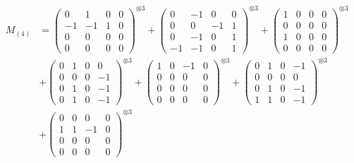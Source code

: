 \documentclass{article}
\newcommand{\Mthree}{%
    M_{(4)}
}
\begin{document}
        \newpage
        
        \footnotesize{
        \begin{align}
        \Mthree
        &= \label{Rs16-Rc11-Solution-24-c1} \begin{pmatrix} 0 & 1 & 0 & 0 \\ -1 & -1 & 1 & 0 \\ 0 & 0 & 0 & 0 \\ 0 & 0 & 0 & 0 \end{pmatrix}^{\otimes 3} 
            + \begin{pmatrix} 0 & -1 & 0 & 0 \\ 0 & 0 & -1 & 1 \\ 0 & -1 & 0 & 1 \\ -1 & -1 & 0 & 1 \end{pmatrix}^{\otimes 3} 
            + \begin{pmatrix} 1 & 0 & 0 & 0 \\ 0 & 0 & 0 & 0 \\ 1 & 0 & 0 & 0 \\ 0 & 0 & 0 & 0 \end{pmatrix}^{\otimes 3} \\
        &+ \label{Rs16-Rc11-Solution-24-c4} \begin{pmatrix} 0 & 1 & 0 & 0 \\ 0 & 0 & 0 & -1 \\ 0 & 1 & 0 & -1 \\ 0 & 1 & 0 & -1 \end{pmatrix}^{\otimes 3} 
            + \begin{pmatrix} 1 & 0 & -1 & 0 \\ 0 & 0 & 0 & 0 \\ 0 & 0 & 0 & 0 \\ 0 & 0 & 0 & 0 \end{pmatrix}^{\otimes 3} 
            + \begin{pmatrix} 0 & 1 & 0 & -1 \\ 0 & 0 & 0 & 0 \\ 0 & 1 & 0 & -1 \\ 1 & 1 & 0 & -1 \end{pmatrix}^{\otimes 3} \\
        &+ \label{Rs16-Rc11-Solution-24-c7} \begin{pmatrix} 0 & 0 & 0 & 0 \\ 1 & 1 & -1 & 0 \\ 0 & 0 & 0 & 0 \\ 0 & 0 & 0 & 0 \end{pmatrix}^{\otimes 3} 

\end{align}}
\end{document}
